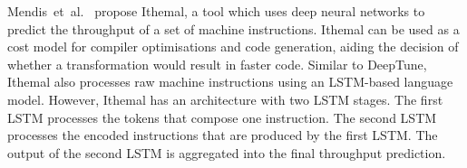 Mendis~et~al.~\cite{mendis19} propose Ithemal, a tool which uses deep neural networks to predict the throughput of a set of machine instructions.
Ithemal can be used as a cost model for compiler optimisations and code generation, aiding the decision of whether a transformation would result in faster code.
Similar to DeepTune, Ithemal also processes raw machine instructions using an LSTM-based language model.
However, Ithemal has an architecture with two LSTM stages.
The first LSTM processes the tokens that compose one instruction.
The second LSTM processes the encoded instructions that are produced by the first LSTM.
The output of the second LSTM is aggregated into the final throughput prediction.
